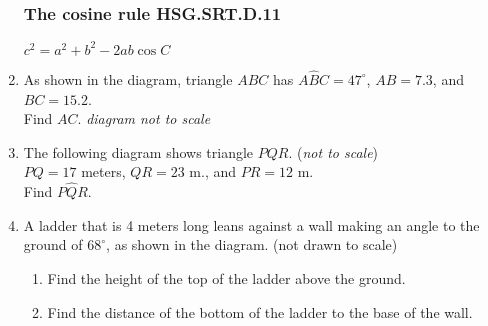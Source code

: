 \documentclass[12pt, twoside]{article}
\begin{document}
\begin{enumerate}
\newpage
\subsubsection*{The cosine rule \hfill HSG.SRT.D.11}
$c^2 = a^2+b^2- 2ab \cos C$
\item As shown in the diagram, triangle $ABC$ has $A\hat{B}C=47^\circ$, $AB=7.3$, and $BC=15.2$. \\[0.25cm]
Find $AC$. \hfill \emph{diagram not to scale}
  \begin{flushright}
  \end{flushright}\vspace{1cm}

\item The following diagram shows triangle $PQR$. (\emph{not to scale}) \\[0.25cm]
$PQ=17$ meters, $QR=23$ m., and $PR=12$ m. \\[0.25cm]
Find $P\hat{Q}R$.
  \begin{flushright}
  \end{flushright}

\newpage
\item A ladder that is 4 meters long leans against a wall making an angle to the ground of $68^\circ$, as shown in the diagram.  \hfill (not drawn to scale)
  \begin{multicols}{2}
    \begin{enumerate}
      \item Find the height of the top of the ladder above the ground. \vspace{2cm}
      \item Find the distance of the bottom of the ladder to the base of the wall.
    \end{enumerate} 
    \begin{flushright}
    \end{flushright}
  \end{multicols}
  \vspace{3cm}


\end{enumerate}
\end{document}
